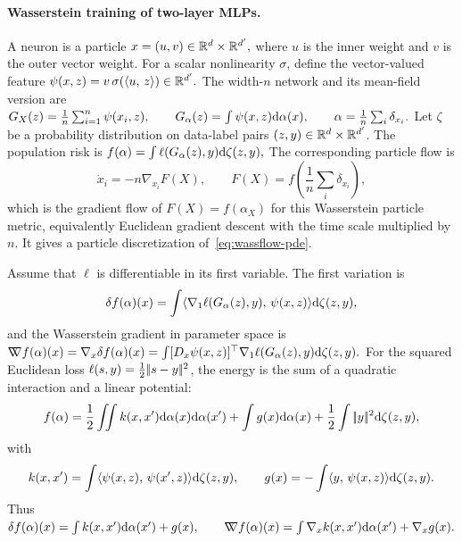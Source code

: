 \paragraph{Wasserstein training of two-layer MLPs.}
A neuron is a particle
\(x=(u,v)\in\mathbb{R}^d\times\mathbb{R}^{d'},\)
where $u$ is the inner weight and $v$ is the outer vector weight. For a scalar nonlinearity $\sigma$, define the vector-valued feature
\(\psi(x,z)=v\,\sigma(\langle u,\,z\rangle)\in\mathbb{R}^{d'}.\)
The width-$n$ network and its mean-field version are \(G_X(z)=\frac1n\sum_{i=1}^n\psi(x_i,z), \qquad G_\alpha(z)=\int\psi(x,z)\mathrm{d}\alpha(x), \qquad \alpha=\frac1n\sum_i\delta_{x_i}.\)
Let $\zeta$ be a probability distribution on data-label pairs $(z,y)\in\mathbb{R}^d\times\mathbb{R}^{d'}$. The population risk is \(f(\alpha)=\int \ell(G_\alpha(z),y)\mathrm{d}\zeta(z,y),\)
The corresponding particle flow is
\[
\dot x_i=-n\nabla_{x_i}F(X),
\qquad
F(X)=f\!\left(\frac1n\sum_i\delta_{x_i}\right),
\]
which is the gradient flow of $F(X)=f(\alpha_X)$ for this Wasserstein particle metric, equivalently Euclidean gradient descent with the time scale multiplied by $n$. It gives a particle discretization of~\eqref{eq:wassflow-pde}.

Assume that $\ell$ is differentiable in its first variable. The first variation is
\begin{equation}\label{eq-mlp-first-variation-general}
\delta f(\alpha)(x)
=
\int
\langle \nabla_1\ell(G_\alpha(z),y),\,\psi(x,z)\rangle
\mathrm{d}\zeta(z,y),
\end{equation}
and the Wasserstein gradient in parameter space is \(\mathord{\nabla\mkern-9.3mu\nabla} f(\alpha)(x) = \nabla_x\delta f(\alpha)(x) = \int [D_x\psi(x,z)]^\top\nabla_1\ell(G_\alpha(z),y) \mathrm{d}\zeta(z,y).\)
For the squared Euclidean loss $\ell(s,y)=\frac12|\!| s-y |\!|^2$, the energy is the sum of a quadratic interaction and a linear potential:
\begin{equation}\label{eq-mlp-square-loss-quadratic-linear}
f(\alpha)
=
\frac12\iint k(x,x')\mathrm{d}\alpha(x)\mathrm{d}\alpha(x')
+
\int g(x)\mathrm{d}\alpha(x)
+\frac12\int|\!| y |\!|^2\mathrm{d}\zeta(z,y),
\end{equation}
with
\begin{equation}\label{eq-mlp-kernel-linear-potential}
k(x,x')=\int\langle \psi(x,z),\,\psi(x',z)\rangle\mathrm{d}\zeta(z,y),
\qquad
g(x)=-\int\langle y,\,\psi(x,z)\rangle\mathrm{d}\zeta(z,y).
\end{equation}
Thus
\(\delta f(\alpha)(x)=\int k(x,x')\mathrm{d}\alpha(x')+g(x), \qquad \mathord{\nabla\mkern-9.3mu\nabla} f(\alpha)(x)=\int\nabla_x k(x,x')\mathrm{d}\alpha(x')+\nabla_xg(x).\)
